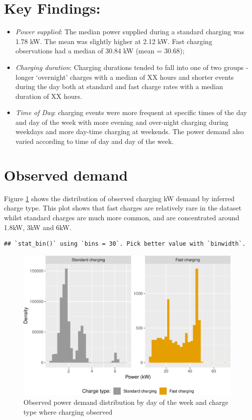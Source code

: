 \documentclass[]{article}
\providecommand{\tightlist}{%
  \setlength{\itemsep}{0pt}\setlength{\parskip}{0pt}}
\begin{document}
\section{Key Findings:}\label{key-findings}

\begin{itemize}
\tightlist
\item
  \emph{Power supplied}: The median power supplied during a standard
  charging was 1.78 kW. The mean was slightly higher at 2.12 kW. Fast
  charging observations had a median of 30.84 kW (mean = 30.68);
\item
  \emph{Charging duration}: Charging durations tended to fall into one
  of two groups - longer `overnight' charges with a median of XX hours
  and shorter events during the day both at standard and fast charge
  rates with a median duration of XX hours.
\item
  \emph{Time of Day}: charging events were more frequent at specific
  times of the day and day of the week with more evening and over-night
  charging during weekdays and more day-time charging at weekends. The
  power demand also varied according to time of day and day of the week.
\end{itemize}

\section{Observed demand}\label{observed-demand}

Figure \ref{fig:obsPower} shows the distribution of observed charging kW
demand by inferred charge type. This plot shows that fast charges are
relatively rare in the dataset whilst standard charges are much more
common, and are concentrated around 1.8kW, 3kW and 6kW.

\begin{verbatim}
## `stat_bin()` using `bins = 30`. Pick better value with `binwidth`.
\end{verbatim}

\begin{figure}
\centering
\includegraphics{EVBB_report_files/figure-latex/obsPower-1.pdf}
\caption{\label{fig:obsPower}Observed power demand distribution by day of
the week and charge type where charging observed}
\end{figure}
\end{document}
